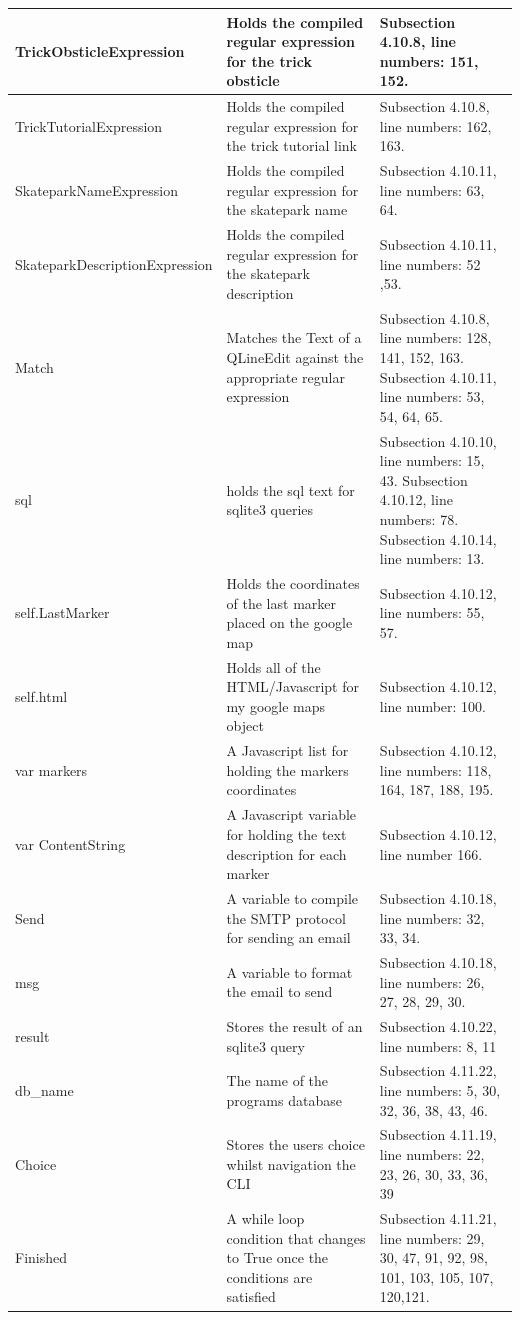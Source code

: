 \begin{center}
\begin{longtable}{|p{3.5cm}|p{6cm}|p{3.5cm}|}
TrickObsticleExpression & Holds the compiled regular expression for the trick obsticle &Subsection 4.10.8, line numbers: 151, 152. \\ \hline
TrickTutorialExpression & Holds the compiled regular expression for the trick tutorial link & Subsection 4.10.8, line numbers: 162, 163. \\ \hline
SkateparkNameExpression & Holds the compiled regular expression for the skatepark name& Subsection 4.10.11, line numbers: 63, 64. \\ \hline
SkateparkDescriptionExpression & Holds the compiled regular expression for the skatepark description & Subsection 4.10.11, line numbers: 52 ,53. \\ \hline
Match & Matches the Text of a QLineEdit against the appropriate regular expression & Subsection 4.10.8, line numbers: 128, 141, 152, 163. Subsection 4.10.11, line numbers: 53, 54, 64, 65. \\ \hline
sql & holds the sql text for sqlite3 queries & Subsection 4.10.10, line numbers: 15, 43. Subsection 4.10.12, line numbers: 78. Subsection 4.10.14, line numbers: 13. \\ \hline
self.LastMarker & Holds the coordinates of the last marker placed on the google map & Subsection 4.10.12, line numbers: 55, 57. \\ \hline
self.html & Holds all of the HTML/Javascript for my google maps object & Subsection 4.10.12, line number: 100. \\ \hline
var markers & A Javascript list for holding the markers coordinates & Subsection 4.10.12, line numbers: 118, 164, 187, 188, 195. \\ \hline
var ContentString & A Javascript variable for holding the text description for each marker & Subsection 4.10.12, line number 166. \\ \hline
Send & A variable to compile the SMTP protocol for sending an email & Subsection 4.10.18, line numbers: 32, 33, 34.  \\ \hline
msg & A variable to format the email to send & Subsection 4.10.18, line numbers: 26, 27, 28, 29, 30. \\ \hline
result & Stores the result of an sqlite3 query & Subsection 4.10.22, line numbers: 8, 11 \\ \hline
db\_name & The name of the programs database & Subsection 4.11.22, line numbers: 5, 30, 32, 36, 38, 43, 46.\\ \hline 
Choice & Stores the users choice whilst navigation the CLI & Subsection 4.11.19, line numbers: 22, 23, 26, 30, 33, 36, 39\\ \hline 
Finished & A while loop condition that changes to True once the conditions are satisfied & Subsection 4.11.21, line numbers: 29, 30, 47, 91, 92, 98, 101, 103, 105, 107, 120,121. \\ \hline



\end{longtable}
\label{tab:Variable List}
\end{center}






